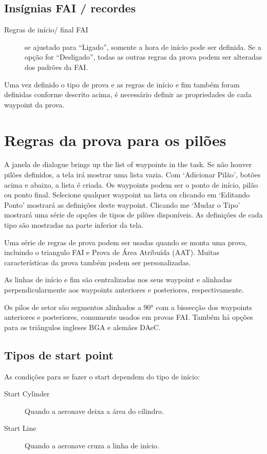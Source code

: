 \subsection*{Insígnias FAI / recordes}
  \begin{description}
  \item [Regras de início/ final FAI] se ajustado para “Ligado”, somente a hora de início pode ser definida.  Se a opção for “Desligado”, todas as outras regras da prova podem ser alteradas dos padrões da FAI.
  \end{description}

Uma vez definido o tipo de prova e as regras de início e fim também foram definidas conforme descrito acima, é necessário definir as propriedades de cada waypoint da prova.

\section{Regras da prova para os pilões}\label{sec:task-rules}

A janela de  dialogue brings up the list of waypoints in the task. 
 Se não houver pilões definidos, a tela irá mostrar uma lista vazia.  Com ‘Adicionar Pilão’, botões acima e abaixo, a lista é criada.  Os waypoints podem ser o ponto de início, pilão ou ponto final.  Selecione qualquer waypoint na lista ou clicando em ‘Editando Ponto’ mostrará as definições deste waypoint.  Clicando me ‘Mudar o Tipo’ mostrará uma série de opções de tipos de pilões disponíveis.  As definições de cada tipo são mostradas na parte inferior da tela.

Uma série de regras de prova podem ser usadas quando se monta uma prova, incluindo o triangulo FAI e Prova de Área Atribuída (AAT).  Muitas características da prova também podem ser personalizadas.

As linhas de início e fim são centralizadas nos seus waypoint e alinhadas perpendicularmente aos waypoints anteriores e posteriores, respectivamente.

Os pilos de setor são segmentos alinhados a 90° com a bissecção dos waypoints anteriores e posteriores, comumente usados em provas FAI.  Também há opções para os triângulos ingleses BGA e alemães DAeC.  

\subsection*{Tipos de start point}
As condições para se fazer o start dependem do tipo de início:
\begin{description}
\item[Start Cylinder] Quando a aeronave deixa a área do cilindro.
\item[Start Line] Quando a aeronave cruza a linha de início.
\end{description}

